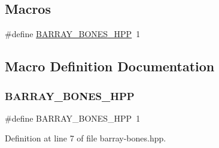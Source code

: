 \subsection*{Macros}
\begin{DoxyCompactItemize}
\item 
\#define \hyperlink{barray-bones_8hpp_a130b55fea4c46b3fc84dc76b641f5f0d}{B\+A\+R\+R\+A\+Y\+\_\+\+B\+O\+N\+E\+S\+\_\+\+H\+PP}~1
\end{DoxyCompactItemize}


\subsection{Macro Definition Documentation}
\mbox{\label{barray-bones_8hpp_a130b55fea4c46b3fc84dc76b641f5f0d}} 
\subsubsection{\texorpdfstring{B\+A\+R\+R\+A\+Y\+\_\+\+B\+O\+N\+E\+S\+\_\+\+H\+PP}{BARRAY\_BONES\_HPP}}
{\footnotesize\ttfamily \#define B\+A\+R\+R\+A\+Y\+\_\+\+B\+O\+N\+E\+S\+\_\+\+H\+PP~1}



Definition at line 7 of file barray-\/bones.\+hpp.

